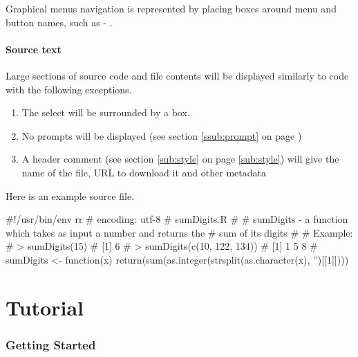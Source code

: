 \documentclass[10pt,letterpaper]{article}
\begin{document}
Graphical menus navigation is represented by placing boxes around menu and button names, such as  - .

\subsection{Source text} %
\label{sub:source_text}

Large sections of source code and file contents will be displayed similarly to \R code with the following exceptions.
\begin{enumerate}
  \item The select will be surrounded by a box. 
  \item No prompts will be displayed (see section \ref{ssub:prompt} on page \pageref{ssub:prompt})
  \item A header comment (see section \ref{sub:style} on page \ref{sub:style}) will give the name of the file, URL to download it and other metadata
\end{enumerate}

Here is an example \R source file.

\begin{RBlistfloat}[h!]
\begin{Schunk}
\begin{Sinput}
 #!/usr/bin/env rr
 # encoding: utf-8
 # sumDigits.R
 #
 # sumDigits - a function which takes as input a number and returns the
 #            sum of its digits
 #
 # Example:
 #       > sumDigits(15)
 #       [1] 6
 #       > sumDigits(c(10, 122, 134))
 #       [1] 1 5 8
 #
 sumDigits <- function(x) {
   return(sum(as.integer(strsplit(as.character(x), '')[[1]])))
 }
\end{Sinput}
\end{Schunk}
\end{RBlistfloat}

\part{Tutorial} %
\label{prt:tutorial}



\section{Getting Started}
\end{document}
